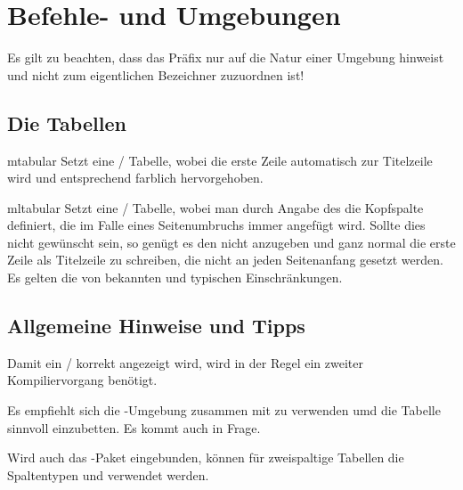 \documentclass{sopra-base}
\begin{document}
%
%
%
%

\section{Befehle- und Umgebungen}

Es gilt zu beachten, dass das Präfix  nur auf die Natur einer Umgebung hinweist und nicht zum eigentlichen Bezeichner zuzuordnen ist!

\subsection{Die Tabellen}

\begin{environment}{mtabular}{}
    Setzt eine / Tabelle, wobei die erste Zeile automatisch zur Titelzeile wird und entsprechend farblich hervorgehoben.
\end{environment}

\begin{environment}{mltabular}{}
    Setzt eine / Tabelle, wobei man durch Angabe des  die Kopfspalte definiert, die im Falle eines Seitenumbruchs immer angefügt wird. Sollte dies nicht gewünscht sein, so genügt es den  nicht anzugeben und ganz normal die erste Zeile als Titelzeile zu schreiben,
    die nicht an jeden Seitenanfang gesetzt werden. Es gelten die von  bekannten und typischen Einschränkungen.
\end{environment}

\subsection{Allgemeine Hinweise und Tipps}

Damit ein / korrekt angezeigt wird, wird in der Regel ein zweiter Kompiliervorgang benötigt.\par{}
Es empfiehlt sich die -Umgebung zusammen mit  zu verwenden umd die Tabelle sinnvoll einzubetten. Es kommt auch  in Frage.\par{}
Wird auch das -Paket eingebunden, können für zweispaltige Tabellen die Spaltentypen  und  verwendet werden.
\end{document}
